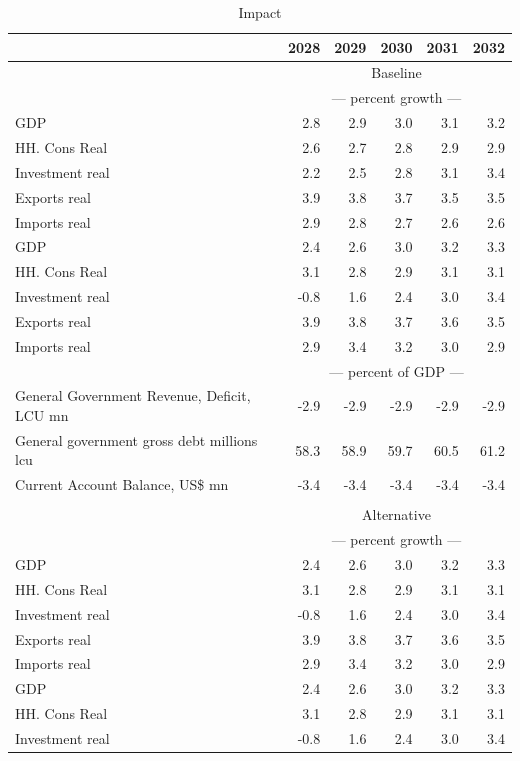 \documentclass{article}
\begin{document}
 \begin{table}[ht]
\caption{Impact}
\begin{tabular}{lrrrrr}
\toprule
 & 2028 & 2029 & 2030 & 2031 & 2032 \\
\midrule
&\multicolumn{5}{c}{Baseline}           \\
&\multicolumn{5}{c}{--- percent growth ---}           \\
GDP & 2.8 & 2.9 & 3.0 & 3.1 & 3.2 \\
HH. Cons Real & 2.6 & 2.7 & 2.8 & 2.9 & 2.9 \\
Investment real & 2.2 & 2.5 & 2.8 & 3.1 & 3.4 \\
Exports real & 3.9 & 3.8 & 3.7 & 3.5 & 3.5 \\
Imports real & 2.9 & 2.8 & 2.7 & 2.6 & 2.6 \\
GDP & 2.4 & 2.6 & 3.0 & 3.2 & 3.3 \\
HH. Cons Real & 3.1 & 2.8 & 2.9 & 3.1 & 3.1 \\
Investment real & -0.8 & 1.6 & 2.4 & 3.0 & 3.4 \\
Exports real & 3.9 & 3.8 & 3.7 & 3.6 & 3.5 \\
Imports real & 2.9 & 3.4 & 3.2 & 3.0 & 2.9 \\
&\multicolumn{5}{c}{--- percent of GDP ---}           \\
General Government Revenue, Deficit, LCU mn & -2.9 & -2.9 & -2.9 & -2.9 & -2.9 \\
General government gross debt millions lcu & 58.3 & 58.9 & 59.7 & 60.5 & 61.2 \\
Current Account Balance, US\$ mn & -3.4 & -3.4 & -3.4 & -3.4 & -3.4 \\
&\multicolumn{5}{c}{  }           \\
&\multicolumn{5}{c}{Alternative}           \\
&\multicolumn{5}{c}{--- percent growth ---}           \\
GDP & 2.4 & 2.6 & 3.0 & 3.2 & 3.3 \\
HH. Cons Real & 3.1 & 2.8 & 2.9 & 3.1 & 3.1 \\
Investment real & -0.8 & 1.6 & 2.4 & 3.0 & 3.4 \\
Exports real & 3.9 & 3.8 & 3.7 & 3.6 & 3.5 \\
Imports real & 2.9 & 3.4 & 3.2 & 3.0 & 2.9 \\
GDP & 2.4 & 2.6 & 3.0 & 3.2 & 3.3 \\
HH. Cons Real & 3.1 & 2.8 & 2.9 & 3.1 & 3.1 \\
Investment real & -0.8 & 1.6 & 2.4 & 3.0 & 3.4 \\

\end{tabular}
\end{table}
\end{document}
